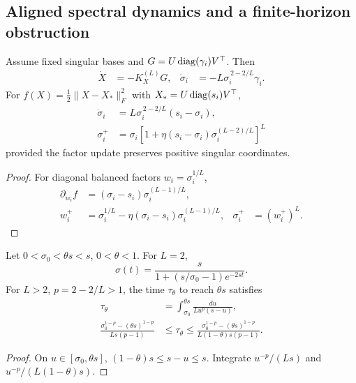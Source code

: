 \subsection{Aligned spectral dynamics and a finite-horizon obstruction}
\begin{proposition}
Assume fixed singular bases and
$G=U\operatorname{diag}(\gamma_i)V^\top$. Then
\begin{align}
\dot X&=-K_X^{(L)}G,&
\dot\sigma_i&=-L\sigma_i^{\,2-2/L}\gamma_i.
\end{align}
For $f(X)=\tfrac12\|X-X_*\|_F^2$ with
$X_*=U\operatorname{diag}(s_i)V^\top$,
\begin{align}
\dot\sigma_i&=L\sigma_i^{\,2-2/L}(s_i-\sigma_i),\\
\sigma_i^+
&=\sigma_i\left[1+\eta(s_i-\sigma_i)
\sigma_i^{(L-2)/L}\right]^L
\label{eq:rigid-aligned-discrete}
\end{align}
provided the factor update preserves positive singular coordinates.
\end{proposition}
\begin{proof}
For diagonal balanced factors $w_i=\sigma_i^{1/L}$,
\begin{align}
\partial_{w_i}f&=(\sigma_i-s_i)\sigma_i^{(L-1)/L},\\
w_i^+&=\sigma_i^{1/L}
-\eta(\sigma_i-s_i)\sigma_i^{(L-1)/L},&
\sigma_i^+&=(w_i^+)^L.
\end{align}
\end{proof}

\begin{corollary}
Let $0<\sigma_0<\theta s<s$, $0<\theta<1$.
For $L=2$,
\begin{equation}
\sigma(t)=\frac{s}{1+(s/\sigma_0-1)e^{-2st}} .
\end{equation}
For $L>2$, $p=2-2/L>1$, the time $\tau_\theta$ to reach $\theta s$ satisfies
\begin{align}
\tau_\theta&=\int_{\sigma_0}^{\theta s}\frac{du}{Lu^p(s-u)},\\
\frac{\sigma_0^{1-p}-(\theta s)^{1-p}}{Ls(p-1)}
&\leq\tau_\theta\leq
\frac{\sigma_0^{1-p}-(\theta s)^{1-p}}{L(1-\theta)s(p-1)} .
\label{eq:rigid-small-mode-time}
\end{align}
\end{corollary}
\begin{proof}
On $u\in[\sigma_0,\theta s]$,
$(1-\theta)s\leq s-u\leq s$. Integrate
$u^{-p}/(Ls)$ and $u^{-p}/(L(1-\theta)s)$.
\end{proof}

